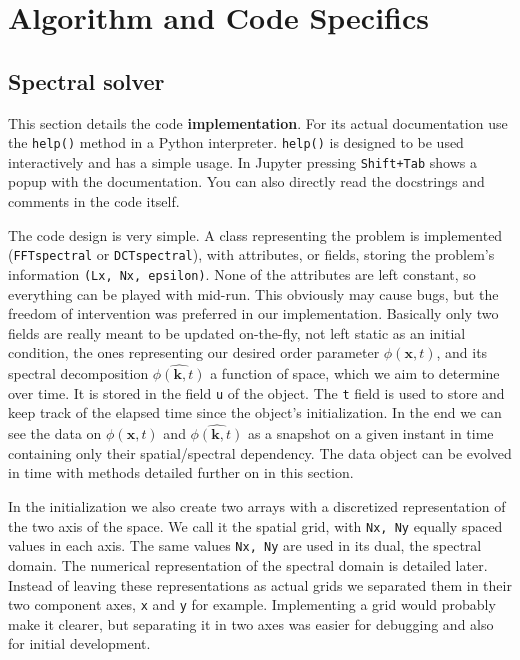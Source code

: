 \documentclass[11pt,a4paper]{report}
\begin{document}
\chapter{Algorithm and Code Specifics}
\section{Spectral solver}
This section details the code {\bf implementation}.
For its actual documentation use the \verb`help()` method in a Python interpreter. 
\verb`help()` is designed to be used interactively and has a simple usage.
In Jupyter pressing \verb`Shift+Tab` shows a popup with the documentation.
You can also directly read the docstrings and comments in the code itself.

The code design is very simple.
A class representing the problem is implemented (\verb`FFTspectral` or \verb`DCTspectral`),
with attributes, or fields, storing the problem's information \verb`(Lx, Nx, epsilon)`.
None of the attributes are left constant, so everything can be played with mid-run.
This obviously may cause bugs, but the freedom of intervention was preferred in our implementation.
Basically only two fields are really meant to be updated on-the-fly,
not left static as an initial condition,
the ones representing our desired order parameter $\phi(\textbf{x}, t)$,
and its spectral decomposition $\hat{\phi(\textbf{k}, t)}$
a function of space,
which we aim to determine over time.
It is stored in the field \verb`u` of the object.
The \verb`t` field is used to store and keep track of the elapsed time since the object's initialization.
In the end we can see the data on
$\phi(\textbf{x}, t)$
and
$\hat{\phi(\textbf{k}, t)}$
as a snapshot on a given instant in time containing only their spatial/spectral dependency.
The data object can be evolved in time with methods detailed further on in this section.

In the initialization we also create two arrays with a discretized representation of the two axis of the space.
We call it the spatial grid, with \verb`Nx, Ny` equally spaced values in each axis.
The same values \verb`Nx, Ny` are used in its dual, the spectral domain.
The numerical representation of the spectral domain is detailed later.
Instead of leaving these representations as actual grids we separated them in their two component axes, \verb`x` and \verb`y` for example.
Implementing a grid would probably make it clearer, but separating it in two axes was easier for debugging and also for initial development.
\end{document}
